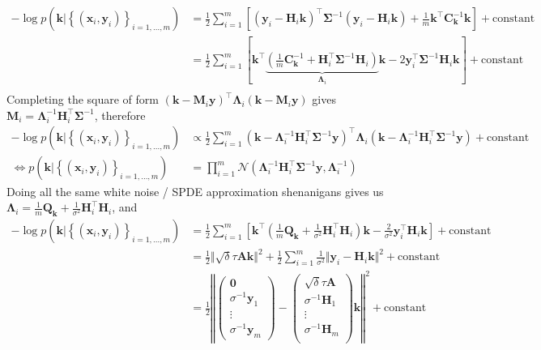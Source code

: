 \documentclass[times, a4paper, 12pt, onecolumn, oneside]{article}
\newcommand{\bm}{\boldsymbol}
\begin{document}
$$
\begin{aligned}
-\log p(\bm{k} | \left\{(\bm{x}_i, \bm{y}_i)\right\}_{i=1,...,m}) &= \frac{1}{2} \sum_{i=1}^m \left[ (\bm{y}_i - \bm{H}_i\bm{k})^\intercal \bm{\Sigma}^{-1}(\bm{y}_i - \bm{H}_i \bm{k}) + \frac{1}{m} \bm{k}^\intercal \bm{C}_{\bm{k}}^{-1} \bm{k} \right] + \text{constant} \\
&= \frac{1}{2} \sum_{i=1}^m \left[ \bm{k}^\intercal \underbrace{ \left(\frac{1}{m}\bm{C}_{\bm{k}}^{-1} + \bm{H}_i^\intercal \bm{\Sigma}^{-1} \bm{H}_i \right)}_{\bm{\Lambda}_i} \bm{k} - 2\bm{y}_i^\intercal \bm{\Sigma}^{-1} \bm{H}_i \bm{k} \right] + \text{constant} \\
\end{aligned}
$$
Completing the square of form $(\bm{k}-\bm{M}_i\bm{y})^\intercal\bm{\Lambda}_i(\bm{k} - \bm{M}_i\bm{y})$ gives $\bm{M}_i = \bm{\Lambda}_i^{-1} \bm{H}_i^\intercal \bm{\Sigma}^{-1}$, therefore
$$
\begin{aligned}
-\log p(\bm{k} | \left\{(\bm{x}_i, \bm{y}_i)\right\}_{i=1,...,m}) &\propto \frac{1}{2} \sum_{i=1}^m (\bm{k} - \bm{\Lambda}_i^{-1} \bm{H}_i^\intercal \bm{\Sigma}^{-1}\bm{y})^\intercal\bm{\Lambda}_i(\bm{k} - \bm{\Lambda}_i^{-1} \bm{H}_i^\intercal \bm{\Sigma}^{-1}\bm{y}) + \text{constant} \\
\Leftrightarrow p(\bm{k} | \left\{(\bm{x}_i, \bm{y}_i)\right\}_{i=1,...,m}) &= \prod_{i=1}^{m}\mathcal{N}(\bm{\Lambda}_i^{-1} \bm{H}_i^\intercal \bm{\Sigma}^{-1}\bm{y}, \bm{\Lambda}_i^{-1})
\end{aligned}
$$
Doing all the same white noise / SPDE approximation shenanigans gives us $\bm{\Lambda}_i =  \frac{1}{m}\bm{Q}_{\bm{k}} + \frac{1}{\sigma^2}\bm{H}_i^\intercal \bm{H}_i$, and
$$
\begin{aligned}
-\log p(\bm{k} | \left\{(\bm{x}_i, \bm{y}_i)\right\}_{i=1,...,m}) &= \frac{1}{2} \sum_{i=1}^m \left[ \bm{k}^\intercal \left(\frac{1}{m}\bm{Q}_{\bm{k}} + \frac{1}{\sigma^2}\bm{H}_i^\intercal \bm{H}_i \right) \bm{k} - \frac{2}{\sigma^2}\bm{y}_i^\intercal \bm{H}_i \bm{k} \right] + \text{constant} \\
&= \frac{1}{2} \Vert \sqrt{\delta}\tau \bm{A} \bm{k} \Vert^2 + \frac{1}{2} \sum_{i=1}^m \frac{1}{\sigma^2} \Vert \bm{y}_i - \bm{H}_i \bm{k} \Vert^2 + \text{constant} \\
&= \frac{1}{2} \left\Vert
\begin{pmatrix}
\bm{0}\\\sigma^{-1}\bm{y}_1\\\vdots\\\sigma^{-1}\bm{y}_m
\end{pmatrix} -
\begin{pmatrix}
\sqrt{\delta}\tau \bm{A}\\\sigma^{-1}\bm{H}_1\\\vdots\\\sigma^{-1}\bm{H}_m\\
\end{pmatrix} \bm{k}
\right\Vert^2 + \text{constant}
\end{aligned}
$$
\end{document}
